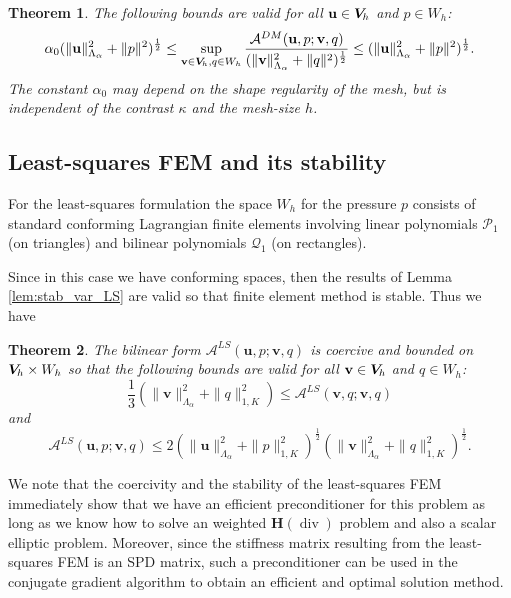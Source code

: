 \documentclass[11pt]{amsart}
\numberwithin{equation}{section}
\newtheorem{theorem}{Theorem}[section]
\theoremstyle{definition}\newtheorem{example}{Example}[section]
\begin{document}
\begin{theorem}\label{DM_stability}
The following bounds are valid for all ${{\mathbf u}} \in {{\boldsymbol V}_{\hspace{-0.2mm}h}}$ and $ p \in W_h$:
\begin{equation}\label{DM-Fem_stability}
\alpha_0 ( \|{{\mathbf u}}\|^2_{\Lambda_{{\alpha}}} +\|p\|^2)^\frac12 \le \sup_{{{\mathbf v}} \in{{\boldsymbol V}_{\hspace{-0.2mm}h}}, q\in W_h} 
\frac{{{\mathcal A}}^{DM}({{\mathbf u}},p; {{\mathbf v}},q) }{(\|{{\mathbf v}}\|^2_{\Lambda_{{\alpha}}} +\|q\|^2)^\frac12} \le 
( \|{{\mathbf u}}\|^2_{\Lambda_{{\alpha}}} +\|p\|^2)^\frac12.
\end{equation} 
The constant $\alpha_0$ may depend on the shape regularity of the 
mesh, but is  independent of the contrast $\kappa$ and the mesh-size $h$.
\end{theorem}

\subsection{Least-squares FEM and its stability}
For the least-squares formulation the space $W_h$ for the pressure $p$  
consists of standard conforming  Lagrangian 
finite elements involving linear polynomials  ${\mathcal P}_1$ (on triangles) 
and bilinear polynomials ${\mathcal Q}_1$ (on rectangles).

Since in this case we have conforming spaces, then the results of Lemma 
\ref{lem:stab_var_LS} are valid so that finite element method is stable. Thus we have
\begin{theorem}\label{LS_stability}
The bilinear form $ {{\mathcal A}}^{LS}({{\mathbf u}},p; {{\mathbf v}},q)$ is coercive and bounded on ${{\boldsymbol V}_{\hspace{-0.2mm}h}} \times W_h$
so that the following bounds are valid for all ${{\mathbf v}} \in {{\boldsymbol V}_{\hspace{-0.2mm}h}}$ and $ q \in W_h$:
\begin{equation}\label{LS-Fem_coercivity}
\frac13 ( \|{{\mathbf v}}\|^2_{\Lambda_{{\alpha}}} +\|q\|^2_{1,K})  \le {{\mathcal A}}^{LS}({{\mathbf v}},q; {{\mathbf v}},q)   
\end{equation}
and 
\begin{equation}\label{LS-FEM-continuity}
 {{\mathcal A}}^{LS}({{\mathbf u}},p; {{\mathbf v}},q)  \le 2
(\|{{\mathbf u}}\|^2_{\Lambda_{{\alpha}}} +\|p\|^2_{1,K})^\frac12
( \|{{\mathbf v}}\|^2_{\Lambda_{{\alpha}}} +\|q\|^2_{1,K})^\frac12.
\end{equation} 
\end{theorem}
We note that the coercivity and the stability of the
  least-squares FEM immediately show that we have an efficient preconditioner
  for this problem as long as we know how to solve an weighted ${{\boldsymbol H}}({\operatorname{div}})$
  problem and also a scalar elliptic problem. Moreover, since the
  stiffness matrix resulting from the least-squares FEM
  is an SPD matrix, such a preconditioner can be used
  in the conjugate gradient algorithm to obtain an efficient and optimal
  solution method.  
\end{document}
